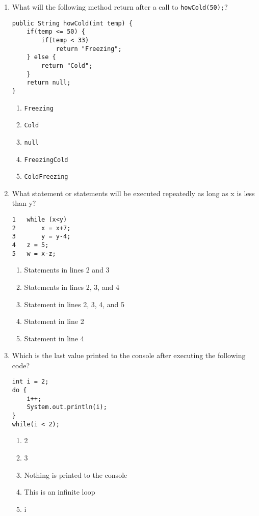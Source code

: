 \documentclass[CS180-S16-FinalExam.tex]{subfiles}
\begin{document}
\begin{enumerate}
\item What will the following method return after a call to \texttt{howCold(50);}?
\begin{lstlisting}
public String howCold(int temp) {
	if(temp <= 50) {
    	if(temp < 33) 
        	return "Freezing";
    } else {
    	return "Cold";
    }
    return null;
}
\end{lstlisting}
\begin{enumerate}
\item  \texttt{Freezing}
\item  \texttt{Cold}
\item  \texttt{null} \ifdraft \Ans \fi
\item  \texttt{FreezingCold}
\item  \texttt{ColdFreezing}
\end{enumerate}

\item What statement or statements will be executed repeatedly as long as x is less than y?
\begin{lstlisting}
1   while (x<y)
2       x = x+7;
3       y = y-4;
4   z = 5;
5   w = x-z;
\end{lstlisting}

\begin{enumerate}
\item Statements in lines 2 and 3
\item Statements in lines  2, 3, and 4
\item Statement in lines 2, 3, 4, and 5
\item Statement in line 2 \ifdraft \Ans \fi
\item Statement in line 4
\end{enumerate}

\clearpage
\item Which is the last value printed to the console after executing the following code?
\begin{lstlisting}
int i = 2;
do {
	i++;
	System.out.println(i);
}
while(i < 2);
\end{lstlisting}

\begin{enumerate}
\item 2 
\item 3 \ifdraft \Ans \fi
\item Nothing is printed to the console
\item This is an infinite loop
\item i
\end{enumerate}


\end{enumerate}
\end{document}
